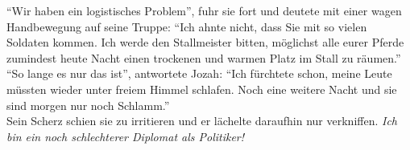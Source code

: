 ``Wir haben ein logistisches Problem'', fuhr sie fort und deutete mit einer wagen Handbewegung auf 
seine Truppe: ``Ich ahnte nicht, dass Sie mit so vielen Soldaten kommen. Ich werde den Stallmeister 
bitten, möglichst alle eurer Pferde zumindest heute Nacht einen trockenen und warmen Platz im Stall 
zu räumen.''\\
``So lange es nur das ist'', antwortete Jozah: ``Ich fürchtete schon, meine Leute müssten wieder 
unter freiem Himmel schlafen. Noch eine weitere Nacht und sie sind morgen nur noch Schlamm.''\\
Sein Scherz schien sie zu irritieren und er lächelte daraufhin nur verkniffen. \textit{Ich bin ein 
noch schlechterer Diplomat als Politiker!}\\



